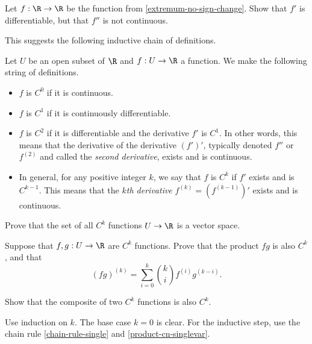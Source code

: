 \begin{exercise} \label{extremum-no-sign-change-continued}
	Let $f : \R \to \R$ be the function from \cref{extremum-no-sign-change}. Show that $f'$ is differentiable, but that $f''$ is not continuous. 
\end{exercise}

This suggests the following inductive chain of definitions. 

\begin{definition} \label{cn-single-var}
	Let $U$ be an open subset of $\R$ and $f : U \to \R$ a function. We make the following string of definitions. 
	\begin{itemize}
		\item $f$ is $C^0$ if it is continuous. 
		\item $f$ is $C^1$ if it is continuously differentiable. 
		\item $f$ is $C^2$ if it is differentiable and the derivative $f'$ is $C^1$. In other words, this means that the derivative of the derivative $(f')'$, typically denoted $f''$ or $f^{(2)}$ and called the \emph{second derivative}, exists and is continuous. 
		\item In general, for any positive integer $k$, we say that $f$ is $C^k$ if $f'$ exists and is $C^{k-1}$. This means that the \emph{$k$th derivative} $f^{(k)} = (f^{(k-1)})'$ exists and is continuous.
	\end{itemize}
\end{definition}

\begin{exercise} \label{sums-scalars-cn-singlevar}
	Prove that the set of all $C^k$ functions $U \to \R$ is a vector space. 
\end{exercise}

\begin{exercise} \label{product-cn-singlevar}
	Suppose that $f, g : U \to \R$ are $C^k$ functions. Prove that the product $fg$ is also $C^k$, and that
	\[ (fg)^{(k)} = \sum_{i = 0}^k \binom{k}{i} f^{(i)} g^{(k-i)}. \]
\end{exercise}

\begin{exercise} \label{composite-cn-singlevar}
	Show that the composite of two $C^k$ functions is also $C^k$. \begin{hint} Use induction on $k$. The base case $k = 0$ is clear. For the inductive step, use the chain rule \ref{chain-rule-single} and \cref{product-cn-singlevar}. \end{hint}
\end{exercise}

